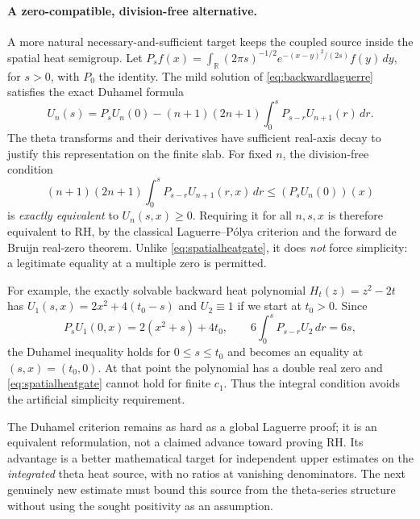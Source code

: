 

\paragraph{A zero-compatible, division-free alternative.}
A more natural necessary-and-sufficient
target keeps the coupled source inside
the spatial heat semigroup. Let
$P_s f(x)=\int_{\mathbb R}
(2\pi s)^{-1/2}
e^{-(x-y)^2/(2s)}f(y)\,dy$,
for $s>0$, with $P_0$ the identity.
The mild solution of
\eqref{eq:backwardlaguerre} satisfies
the exact Duhamel formula
\begin{equation}
U_n(s)=P_sU_n(0)-
(n+1)(2n+1)\int_0^s
P_{s-r}U_{n+1}(r)\,dr.
\label{eq:duhamellaguerre}
\end{equation}
The theta transforms and their
derivatives have sufficient
real-axis decay to justify this
representation on the finite slab.
For fixed $n$, the division-free
condition
\begin{equation}
\boxed{
(n+1)(2n+1)\int_0^s
P_{s-r}U_{n+1}(r,x)\,dr
\le(P_sU_n(0))(x)
}
\label{eq:duhamelmissing}
\end{equation}
is \emph{exactly equivalent} to
$U_n(s,x)\ge0$.
Requiring it for all $n,s,x$ is
therefore equivalent to RH, by
the classical Laguerre--P\'olya
criterion and the forward
de Bruijn real-zero theorem.
Unlike \eqref{eq:spatialheatgate},
it does \emph{not} force simplicity:
a legitimate equality at a
multiple zero is permitted.

For example, the exactly solvable
backward heat polynomial
$H_t(z)=z^2-2t$ has
$U_1(s,x)=2x^2+4(t_0-s)$ and
$U_2\equiv1$ if we start at
$t_0>0$. Since
\[
P_sU_1(0,x)=2(x^2+s)+4t_0,
\qquad 6\int_0^sP_{s-r}U_2\,dr=6s,
\]
the Duhamel inequality holds
for $0\le s\le t_0$ and
becomes an equality at
$(s,x)=(t_0,0)$.
At that point the polynomial
has a double real zero and
\eqref{eq:spatialheatgate}
cannot hold for finite $c_1$.
Thus the integral condition
avoids the artificial simplicity
requirement.

The Duhamel criterion remains as
hard as a global Laguerre proof;
it is an equivalent reformulation,
not a claimed advance toward
proving RH. Its advantage is
a better mathematical target
for independent upper estimates
on the \emph{integrated} theta
heat source, with no ratios
at vanishing denominators.
The next genuinely new estimate
must bound this source from the
theta-series structure without
using the sought positivity
as an assumption.

